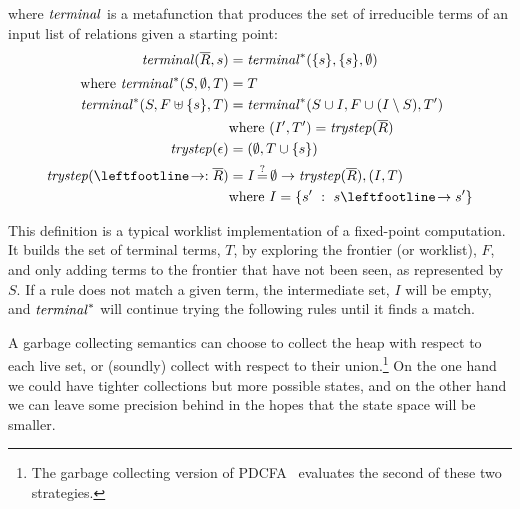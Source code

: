 where $\mathit{terminal}$ is a metafunction that produces the set of irreducible terms of an input list of relations given a starting point:
\begin{align*}
  \terminal(\overline{R},s) &= \terminalaux(\set{s},\set{s},\emptyset) \\[2pt]
  \text{where } \terminalaux(S, \emptyset, T) &= T \\
   \terminalaux(S, F \uplus \set{s}, T) &= \terminalaux(S\cup I, F \cup (I \setminus S), T') \\
   & \text{where } (I',T') = \trystep(\overline{R}) \\
   \trystep(\epsilon) &= (\emptyset,T\cup\set{s}) \\
   \trystep(\stepto:\overline{R}) &= I\deceq\emptyset \to \trystep(\overline{R}), (I, T) \\
    & \text{where } I = \setbuild{s'}{s \stepto s'}
\end{align*}

This definition is a typical worklist implementation of a fixed-point computation.
%
It builds the set of terminal terms, $T$, by exploring the frontier (or worklist), $F$, and only adding terms to the frontier that have not been seen, as represented by $S$.
%
If a rule does not match a given term, the intermediate set, $I$ will be empty, and $\mathit{terminal}^*$ will continue trying the following rules until it finds a match.
%

%
A garbage collecting semantics can choose to collect the heap with respect to each live set, or (soundly) collect with respect to their union.\footnote{The garbage collecting version of PDCFA~\citep{ianjohnson:DBLP:journals/jfp/JohnsonSEMH14} evaluates the second of these two strategies.}
%
On the one hand we could have tighter collections but more possible states, and on the other hand we can leave some precision behind in the hopes that the state space will be smaller.
%

